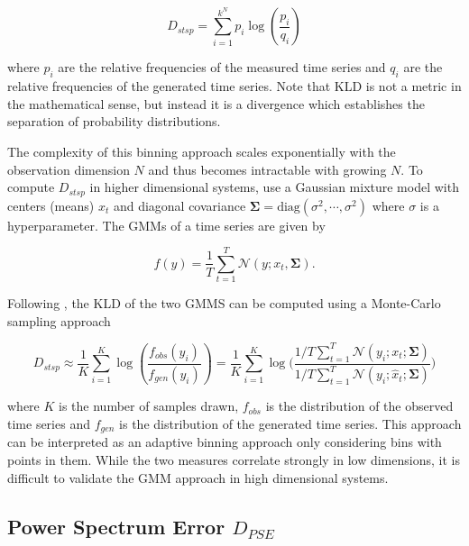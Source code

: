 \begin{equation}
    D_{stsp} = \sum_{i=1}^{k^N} p_i \log \left(\frac{p_i}{q_i}\right)
\end{equation}

where $p_i$ are the relative frequencies of the measured time series and $q_i$ are the relative frequencies of the generated time series. Note that KLD is not a metric in 
the mathematical sense, but instead it is a divergence which establishes the separation of probability distributions.

The complexity of this binning approach scales exponentially with the observation dimension $N$ and thus becomes intractable with growing $N$. To compute $D_{stsp}$ in higher 
dimensional systems, \cite{brenner2022tractable} use a Gaussian mixture model with centers (means) $x_t$ and diagonal covariance 
$\boldsymbol{\Sigma}=\text{diag}(\sigma^2, \cdots, \sigma^2)$ where $\sigma$ is a hyperparameter. The GMMs of a time series are given by 

\begin{equation}
    f(y) = \frac{1}{T} \sum_{t=1}^{T} \mathcal{N}(y;x_t,\boldsymbol{\Sigma}).
\end{equation}

Following \cite{hershey2007approximating}, the KLD of the two GMMS can be computed using a Monte-Carlo sampling approach 

\begin{equation}
    D_{stsp} \approx \frac{1}{K} \sum_{i=1}^{K} \log \left(\frac{f_{obs}(y_{i})}{f_{gen}(y_{i})}\right) 
             = \frac{1}{K} \sum_{i=1}^{K} \log \Bigg ( \frac{1/T \sum_{t=1}^{T} \mathcal{N}\left( y_i;x_t;\boldsymbol{\Sigma}\right)}{1/T \sum_{t=1}^{T} \mathcal{N}\left(y_i;\hat{x}_t;\boldsymbol{\Sigma}\right)}\Bigg )
\end{equation}

where $K$ is the number of samples drawn, $f_{obs}$ is the distribution of the observed time series and $f_{gen}$ is the distribution of the generated time series.
This approach can be interpreted as an adaptive binning approach only considering bins with points in them. While the two measures correlate strongly in low dimensions,
it is difficult to validate the GMM approach in high dimensional systems.

\subsection{Power Spectrum Error \texorpdfstring{$D_{PSE}$}{Lg}} \label{sec:d_pse}

